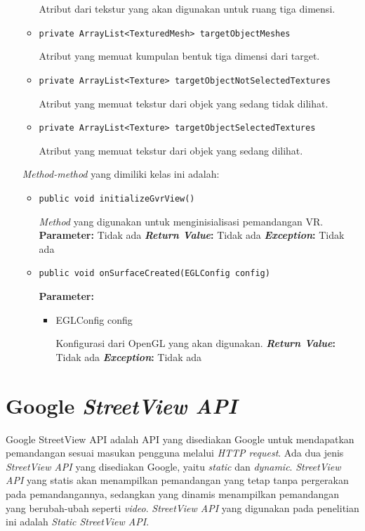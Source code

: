 \begin{enumerate}
\begin{itemize}
  		Atribut dari tekstur yang akan digunakan untuk ruang tiga dimensi.
  		\item \texttt{private ArrayList<TexturedMesh> targetObjectMeshes}
  		
  		Atribut yang memuat kumpulan bentuk tiga dimensi dari target.
  		\item \texttt{private ArrayList<Texture> targetObjectNotSelectedTextures}
  		
  		
  		Atribut yang memuat tekstur dari objek yang sedang tidak dilihat.
  		\item \texttt{private ArrayList<Texture> targetObjectSelectedTextures}
  		
  		Atribut yang memuat tekstur dari objek yang sedang dilihat.
	\end{itemize}
	
	\textit{Method-method} yang dimiliki kelas ini adalah:
	
	\begin{itemize}
		\item \texttt{public void initializeGvrView()}
		
		\textit{Method} yang digunakan untuk menginisialisasi pemandangan VR.
		\textbf{Parameter:} Tidak ada
		\textbf{\textit{Return Value}:} Tidak ada
		\textbf{\textit{Exception}:} Tidak ada		
		
		\item \texttt{public void onSurfaceCreated(EGLConfig config)}
		
		\textbf{Parameter:}
			\begin{itemize}
			\item EGLConfig config
			
		Konfigurasi dari OpenGL yang akan digunakan.
		\textbf{\textit{Return Value}:} Tidak ada
		\textbf{\textit{Exception}:} Tidak ada		
					
			
\end{itemize}					
		
	\end{itemize}
	
\end{enumerate}


\section{Google \it{StreetView API}}
\label{sec:streetview}
Google StreetView API adalah API yang disediakan Google untuk mendapatkan pemandangan sesuai masukan pengguna melalui \textit{HTTP request}. Ada dua jenis {\it StreetView API} yang disediakan Google, yaitu {\it static} dan {\it dynamic}. {\it StreetView API} yang statis akan menampilkan pemandangan yang tetap tanpa pergerakan pada pemandangannya, sedangkan yang dinamis menampilkan pemandangan yang berubah-ubah seperti {\it video}. {\it StreetView API} yang digunakan pada penelitian ini adalah {\it Static StreetView API}.


